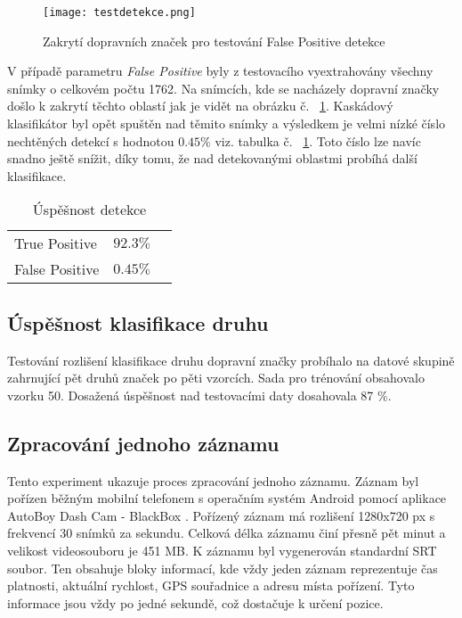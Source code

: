 \documentclass[czech]{ExcelAtFIT} %
\begin{document}
\begin{figure}[t]
\centering
\texttt{[image: testdetekce.png]}\\[1pt]
\caption{Zakrytí dopravních značek pro testování False Positive detekce}
  \label{fig:DetectionTest}
\end{figure}

V případě parametru \emph{False Positive} byly z testovacího vyextrahovány všechny snímky o celkovém počtu 1762. Na snímcích, kde se nacházely dopravní značky došlo k zakrytí těchto oblastí jak je vidět na obrázku č. ~\ref{fig:DetectionTest}. Kaskádový klasifikátor byl opět spuštěn nad těmito snímky a výsledkem je velmi nízké číslo nechtěných detekcí s hodnotou $0.45 \%$ viz. tabulka č. ~\ref{tab:SuccessTable}. Toto číslo lze navíc snadno ještě snížit, díky tomu, že nad detekovanými oblastmi probíhá další klasifikace.

\begin{table}[h]
	\vskip6pt
	\caption{Úspěšnost detekce}
	\centering
	\begin{tabular}{llr}
		\toprule
		True Positive & $92.3 \%$ \\
		False Positive & $0.45 \%$ \\
		\bottomrule
	\end{tabular}
	\label{tab:SuccessTable}
\end{table}

\subsection{Úspěšnost klasifikace druhu}
Testování rozlišení klasifikace druhu dopravní značky probíhalo na datové skupině zahrnující pět druhů značek po pěti vzorcích. Sada pro trénování obsahovalo vzorku 50. Dosažená úspěšnost nad testovacími daty dosahovala 87 \%.

\subsection{Zpracování jednoho záznamu}

Tento experiment ukazuje proces zpracování jednoho záznamu. Záznam byl pořízen běžným mobilní telefonem s operačním systém Android pomocí aplikace AutoBoy Dash Cam - BlackBox \cite{autoboy}. Pořízený záznam má rozlišení 1280x720 px s frekvencí 30 snímků za sekundu. Celková délka záznamu činí  přesně pět minut a velikost videosouboru je  451 MB.  K záznamu byl vygenerován  standardní SRT soubor. Ten obsahuje  bloky informací, kde  vždy jeden záznam  reprezentuje čas platnosti, aktuální rychlost, GPS souřadnice a adresu místa pořízení. Tyto informace jsou vždy po jedné sekundě, což dostačuje k určení pozice.
\end{document}
